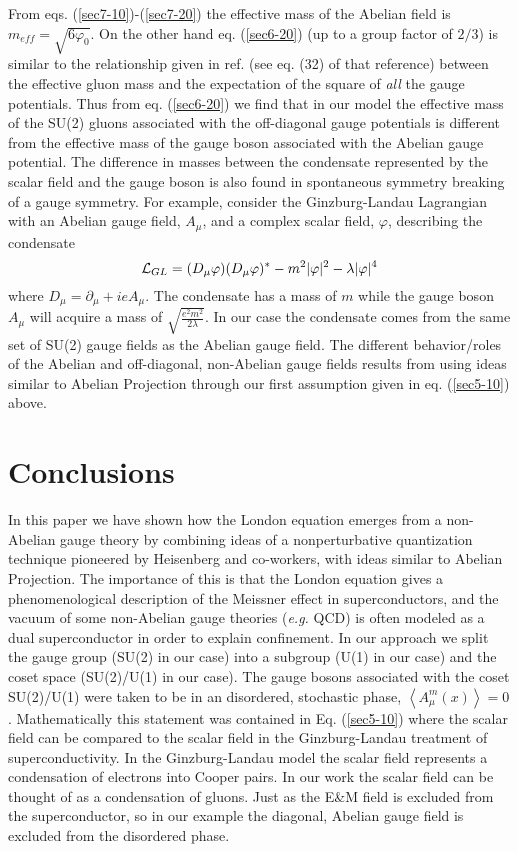 \documentclass[a4paper,aps,showpacs]{revtex4}
\begin{document}
From eqs. (\ref{sec7-10})-(\ref{sec7-20}) the effective mass
of the Abelian field is $m_{eff} = \sqrt{6 \varphi_0}$. On the
other hand eq. (\ref{sec6-20}) (up to a group factor of
$2/3$) is similar to the relationship given in ref.
\cite{cw1} (see eq. (32) of that reference) between the
effective gluon mass and the expectation of the square
of {\it all} the gauge potentials. Thus from eq.
(\ref{sec6-20}) we find that in our model the effective mass of
the SU(2) gluons associated with the off-diagonal
gauge potentials is different from the effective mass of the
gauge boson associated with the Abelian gauge potential. The
difference in masses between the condensate represented
by the scalar field and the gauge boson is also found in
spontaneous symmetry breaking of a gauge symmetry. For example,
consider the Ginzburg-Landau Lagrangian with an Abelian gauge
field, $A_{\mu}$, and a complex scalar field, $\varphi$,
describing the condensate
\begin{equation}
\label{gl}
{\cal L}_{GL} = (D_{\mu} \varphi)(D_{\mu} \varphi)^{\ast}
- m^2 |\varphi | ^2
-\lambda | \varphi |^4
\end{equation}
where $D_{\mu} =\partial _{\mu} +ie A_{\mu}$. The condensate has
a mass of $m$ while the gauge boson $A_{\mu}$ will acquire a mass
of $\sqrt{\frac{e^2 m^2}{2 \lambda}}$. In our case the condensate
comes from the same set of SU(2) gauge fields as the Abelian
gauge field. The different behavior/roles of the Abelian and
off-diagonal, non-Abelian gauge fields results from using
ideas similar to Abelian Projection through our first assumption
given in eq. (\ref{sec5-10}) above.

\section{Conclusions}

In this paper we have shown how the London equation emerges
from a non-Abelian gauge theory by combining ideas of a
nonperturbative quantization technique pioneered
by Heisenberg and co-workers, with ideas similar to
Abelian Projection. The importance of this is that
the London equation gives a phenomenological description of
the Meissner effect in superconductors, and the vacuum of some
non-Abelian gauge theories ({\it e.g.} QCD) is often modeled as
a dual superconductor in order to explain confinement. In our
approach we split the gauge group (SU(2) in our case) into a 
subgroup (U(1) in our case) and the coset space (SU(2)/U(1) in
our case). The gauge bosons associated with the coset SU(2)/U(1)
were taken to be in an disordered, stochastic phase,
$\left\langle A^m_\mu (x) \right\rangle = 0$. Mathematically
this statement was contained in Eq. (\ref{sec5-10}) where the
scalar field can be compared to the scalar field in the Ginzburg-Landau
treatment of superconductivity. In the Ginzburg-Landau model
the scalar field represents a condensation of electrons into
Cooper pairs. In our work the scalar field can be thought
of as a condensation of gluons. Just as the E\&M field is
excluded from the superconductor, so in our example the diagonal,
Abelian gauge field is excluded from the disordered phase.
\end{document}
